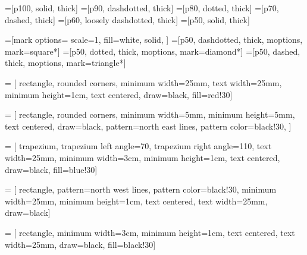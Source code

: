 \tikzset{external/force remake}
  \tikzexternalize[prefix=External/]

\tikzset{>=latex}


=[p100, solid, thick]
=[p90, dashdotted, thick]
=[p80, dotted, thick]
=[p70, dashed, thick]
=[p60, loosely dashdotted, thick]
=[p50, solid, thick]

=[mark options={
  scale=1,
  fill=white,
  solid,
  }]
=[p50, dashdotted, thick, moptions, mark=square*]
=[p50, dotted, thick, moptions, mark=diamond*]
=[p50, dashed, thick, moptions, mark=triangle*]

 = [
  rectangle,
  rounded corners,
  minimum width=25mm,
  text width=25mm,
  minimum height=1cm,
  text centered,
  draw=black,
  fill=red!30]

 = [
  rectangle,
  rounded corners,
  minimum width=5mm,
  minimum height=5mm,
  text centered,
  draw=black,
  pattern=north east lines,
  pattern color=black!30,
  ]

 = [
  trapezium,
  trapezium left angle=70,
  trapezium right angle=110,
  text width=25mm,
  minimum width=3cm,
  minimum height=1cm,
  text centered,
  draw=black,
  fill=blue!30]

 = [
  rectangle,
  pattern=north west lines,
  pattern color=black!30,
  minimum width=25mm,
  minimum height=1cm,
  text centered,
  text width=25mm,
  draw=black]

 = [
  rectangle,
  minimum width=3cm,
  minimum height=1cm,
  text centered,
  text width=25mm,
  draw=black,
  fill=black!30]






